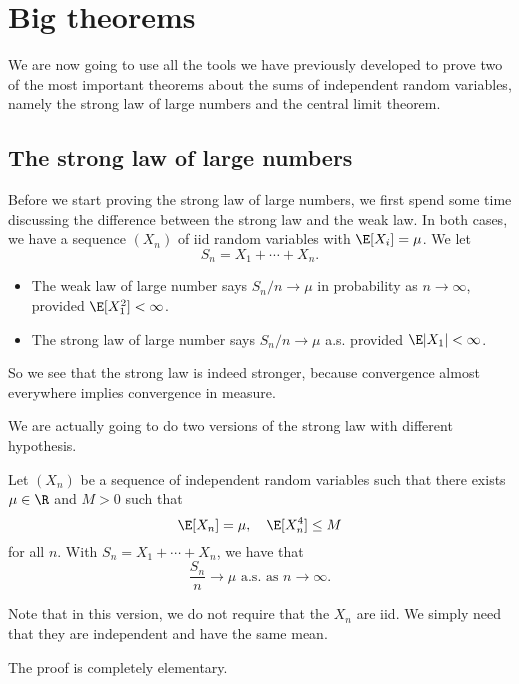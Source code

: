 \documentclass[a4paper]{article}
\begin{document}
\section{Big theorems}
We are now going to use all the tools we have previously developed to prove two of the most important theorems about the sums of independent random variables, namely the strong law of large numbers and the central limit theorem.

\subsection{The strong law of large numbers}
Before we start proving the strong law of large numbers, we first spend some time discussing the difference between the strong law and the weak law. In both cases, we have a sequence $(X_n)$ of iid random variables with $\E[X_i] = \mu$. We let
\[
  S_n = X_1 + \cdots + X_n.
\]
\begin{itemize}
  \item The weak law of large number says $S_n/n \to \mu$ in probability as $n \to \infty$, provided $\E[X_1^2] < \infty$.
  \item The strong law of large number says $S_n/n \to \mu$ a.s. provided $\E|X_1| < \infty$.
\end{itemize}
So we see that the strong law is indeed stronger, because convergence almost everywhere implies convergence in measure.

We are actually going to do two versions of the strong law with different hypothesis.
\begin{thm}
  Let $(X_n)$ be a sequence of independent random variables such that there exists $\mu \in \R$ and $M > 0$ such that
  \[
    \E[X_n] = \mu,\quad \E[X_n^4] \leq M
  \]
  for all $n$. With $S_n = X_1 + \cdots + X_n$, we have that
  \[
    \frac{S_n}{n} \to \mu\text{ a.s. as }n \to \infty.
  \]
\end{thm}
Note that in this version, we do not require that the $X_n$ are iid. We simply need that they are independent and have the same mean.

The proof is completely elementary.
\end{document}
